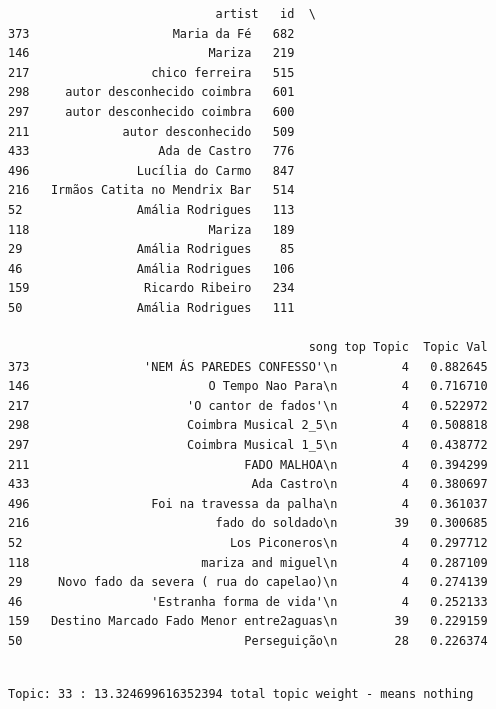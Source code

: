 \documentclass[11pt]{article}
\begin{document}
    
    \begin{verbatim}
                             artist   id  \
373                    Maria da Fé   682   
146                         Mariza   219   
217                 chico ferreira   515   
298     autor desconhecido coimbra   601   
297     autor desconhecido coimbra   600   
211             autor desconhecido   509   
433                  Ada de Castro   776   
496               Lucília do Carmo   847   
216   Irmãos Catita no Mendrix Bar   514   
52                Amália Rodrigues   113   
118                         Mariza   189   
29                Amália Rodrigues    85   
46                Amália Rodrigues   106   
159                Ricardo Ribeiro   234   
50                Amália Rodrigues   111   

                                          song top Topic  Topic Val  
373                'NEM ÁS PAREDES CONFESSO'\n         4   0.882645  
146                         O Tempo Nao Para\n         4   0.716710  
217                      'O cantor de fados'\n         4   0.522972  
298                      Coimbra Musical 2_5\n         4   0.508818  
297                      Coimbra Musical 1_5\n         4   0.438772  
211                              FADO MALHOA\n         4   0.394299  
433                               Ada Castro\n         4   0.380697  
496                 Foi na travessa da palha\n         4   0.361037  
216                          fado do soldado\n        39   0.300685  
52                             Los Piconeros\n         4   0.297712  
118                        mariza and miguel\n         4   0.287109  
29     Novo fado da severa ( rua do capelao)\n         4   0.274139  
46                  'Estranha forma de vida'\n         4   0.252133  
159   Destino Marcado Fado Menor entre2aguas\n        39   0.229159  
50                               Perseguição\n        28   0.226374  
    \end{verbatim}

    
    \begin{Verbatim}[commandchars=\\\{\}]

Topic: 33 : 13.324699616352394 total topic weight - means nothing

    \end{Verbatim}
\end{document}
